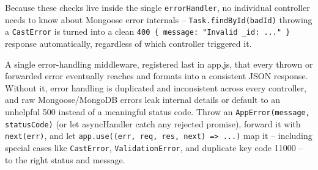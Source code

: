 \begin{tipbox}[TIP]
Because these checks live inside the single \texttt{errorHandler}, no
individual controller needs to know about Mongoose error internals --
\texttt{Task.findById(badId)} throwing a \texttt{CastError} is turned into a
clean \texttt{400 \{ message: "Invalid \_id: ..." \}} response automatically,
regardless of which controller triggered it.
\end{tipbox}

\whatwhyhow
{A single error-handling middleware, registered last in app.js, that every thrown or forwarded error eventually reaches and formats into a consistent JSON response.}
{Without it, error handling is duplicated and inconsistent across every controller, and raw Mongoose/MongoDB errors leak internal details or default to an unhelpful 500 instead of a meaningful status code.}
{Throw an \texttt{AppError(message, statusCode)} (or let asyncHandler catch any rejected promise), forward it with \texttt{next(err)}, and let \texttt{app.use((err, req, res, next) => ...)} map it -- including special cases like \texttt{CastError}, \texttt{ValidationError}, and duplicate key code 11000 -- to the right status and message.}
